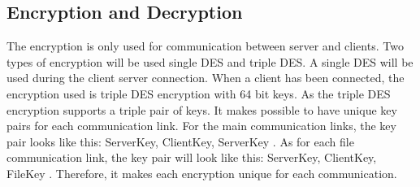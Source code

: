 \subsection{Encryption and Decryption}

The encryption is only used for communication between server and clients. Two types of encryption will be used single DES and triple DES. A single DES will be used during the client server connection. When a client has been connected, the encryption used is triple DES encryption with 64 bit keys. As the triple DES encryption supports a triple pair of keys. It makes possible to have unique key pairs for each communication link. For the main communication links, the key pair looks like this: { ServerKey, ClientKey, ServerKey }. As for each file communication link, the key pair will look like this: { ServerKey, ClientKey, FileKey }. Therefore, it makes each encryption unique for each communication. 
